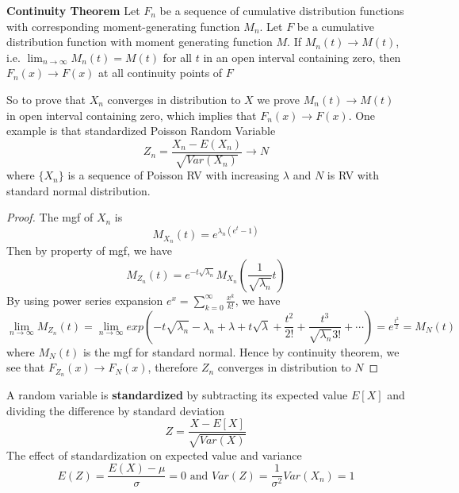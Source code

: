 \documentclass[11pt]{article}
\begin{document}
\begin{theorem*}
  \textbf{Continuity Theorem} Let $F_n$ be a sequence of cumulative distribution functions with corresponding moment-generating function $M_n$. Let $F$ be a cumulative distribution function with moment generating function $M$. If $M_n(t)\to M(t)$, i.e. $\lim_{n\to\infty} M_n(t) = M(t)$ for all $t$ in an open interval containing zero, then $F_n(x)\to F(x)$ at all continuity points of $F$
  \begin{rem}
    So to prove that $X_n$ converges in distribution to $X$ we prove $M_n(t) \to M(t)$ in open interval containing zero, which implies that $F_n(x) \to F(x)$. One example is that standardized Poisson Random Variable
    \[
      Z_n = \frac{X_n - E(X_n)}{\sqrt{Var(X_n)}} \to N
    \]
    where $\{ X_n\}$ is a sequence of Poisson RV with increasing $\lambda$ and $N$ is RV with standard normal distribution.
    \begin{proof}
      The mgf of $X_n$ is
      \[
        M_{X_n}(t) = e^{\lambda_n(e^t-1)}
      \]
      Then by property of mgf, we have
      \[
        M_{Z_n}(t) = e^{-t\sqrt{\lambda_n}} M_{X_n}(\frac{1}{\sqrt{\lambda_n}}t)
      \]
      By using power series expansion $e^x = \sum_{k=0}^{\infty} \frac{x^k}{k!}$, we have
      \[
        \lim_{n\to \infty} M_{Z_n}(t) = \lim_{n\to\infty} exp(-t\sqrt{\lambda_n} - \lambda_n + \lambda + t\sqrt{\lambda} + \frac{t^2}{2!} + \frac{t^3}{\sqrt{\lambda_n}3!} + \cdots) = e^{\frac{t^2}{2}} = M_N(t)
      \]
      where $M_N(t)$ is the mgf for standard normal. Hence by continuity theorem, we see that $F_{Z_n}(x) \to F_N(x)$, therefore $Z_n$ converges in distribution to $N$
    \end{proof}
  \end{rem}
\end{theorem*}

\begin{defn*}
  A random variable is \textbf{standardized} by subtracting its expected value $E[X]$ and dividing the difference by standard deviation
  \[
    Z = \frac{X - E[X]}{\sqrt{Var(X)}}
  \]
  The effect of standardization on expected value and variance
  \[
    E(Z) = \frac{E(X) - \mu}{\sigma} = 0 \text{ and } Var(Z) = \frac{1}{\sigma^2} Var(X_n) = 1
  \]
\end{defn*}
\end{document}

